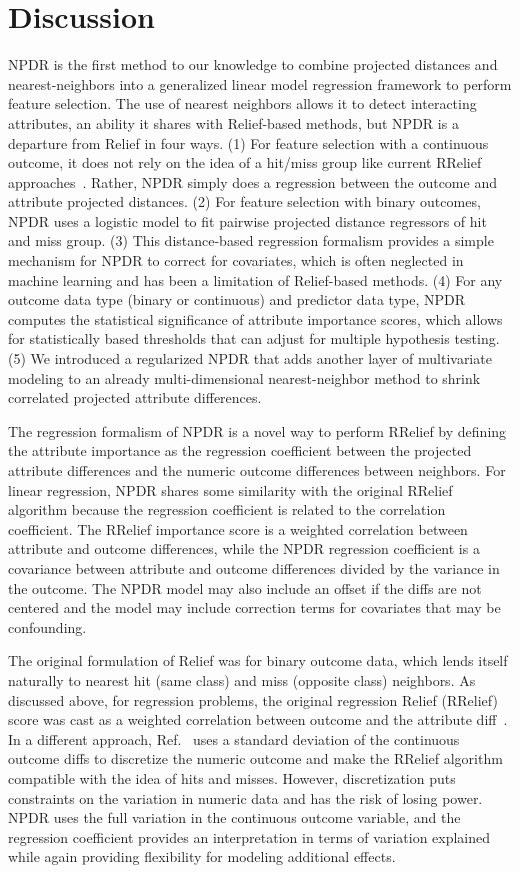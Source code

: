 \documentclass[10pt]{article}
\begin{document}
\section{Discussion}
NPDR is the first method to our knowledge to combine projected distances and nearest-neighbors into a generalized linear model regression framework to perform feature selection. The use of nearest neighbors allows it to detect interacting attributes, an ability it shares with Relief-based methods, but NPDR is a departure from Relief in four ways. (1) For feature selection with a continuous outcome, it does not rely on the idea of a hit/miss group like current RRelief approaches~\cite{urbanowicz17}. Rather, NPDR simply does a regression between the outcome and attribute projected distances. (2) For feature selection with binary outcomes, NPDR uses a logistic model to fit pairwise projected distance regressors of hit and miss group. (3) This distance-based regression formalism provides a simple mechanism for NPDR to correct for covariates, which is often neglected in machine learning and has been a limitation of Relief-based methods. (4) For any outcome data type (binary or continuous) and predictor data type, NPDR computes the statistical significance of attribute importance scores, which allows for statistically based thresholds that can adjust for multiple hypothesis testing. (5) We introduced a regularized NPDR that adds another layer of multivariate modeling to an already multi-dimensional nearest-neighbor method to shrink correlated projected attribute differences.  

The regression formalism of NPDR is a novel way to perform RRelief by defining the attribute importance as the regression coefficient between the projected attribute differences and the numeric outcome differences between neighbors.  For linear regression, NPDR shares some similarity with the original RRelief algorithm because the regression coefficient is related to the correlation coefficient. The RRelief importance score is a weighted correlation between attribute and outcome differences, while the NPDR regression coefficient is a covariance between attribute and outcome differences divided by the variance in the outcome. The NPDR model may also include an offset if the diffs are not centered and the model may include correction terms for covariates that may be confounding. 

The original formulation of Relief was for binary outcome data, which lends itself naturally to nearest hit (same class) and miss (opposite class) neighbors. As discussed above, for regression problems, the original regression Relief (RRelief) score was cast as a weighted correlation between outcome and the attribute diff~\cite{robnik03}. In a different approach, Ref.~\cite{urbanowicz17} uses a standard deviation of the continuous outcome diffs to discretize the numeric outcome and make the RRelief algorithm compatible with the idea of hits and misses. However, discretization puts constraints on the variation in numeric data and has the risk of losing power. NPDR uses the full variation in the continuous outcome variable, and the regression coefficient provides an interpretation in terms of variation explained while again providing flexibility for modeling additional effects. 
\end{document}
